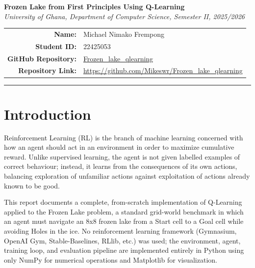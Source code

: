 \documentclass[11pt]{article}
\begin{document}
\setlength{\parskip}{5pt}
\setlength{\parindent}{0pt}

\begin{center}
{\LARGE\bfseries\color{black} Frozen Lake from First Principles Using Q-Learning}\\[6pt]
{\itshape\color{graytext} University of Ghana, Department of Computer Science, Semester II, 2025/2026}
\end{center}

\vspace{10pt}
\begin{center}
\begin{tabular}{r l}
\textbf{Name:} & Michael Nimako Frempong \\
\textbf{Student ID:} & 22425053 \\
\textbf{GitHub Repository:} & \href{https://github.com/Mikeswr/Frozen_lake_qlearning}{Frozen\_lake\_qlearning} \\
\textbf{Repository Link:} & \href{https://github.com/Mikeswr/Frozen_lake_qlearning}{https://github.com/Mikeswr/Frozen\_lake\_qlearning} \\
\end{tabular}
\end{center}

\vspace{4pt}
\noindent\textcolor{black}{\rule{\linewidth}{1pt}}
\vspace{6pt}

\section{Introduction}

Reinforcement Learning (RL) is the branch of machine learning concerned with how an agent should act in an environment in order to maximize cumulative reward. Unlike supervised learning, the agent is not given labelled examples of correct behaviour; instead, it learns from the consequences of its own actions, balancing exploration of unfamiliar actions against exploitation of actions already known to be good.

This report documents a complete, from-scratch implementation of Q-Learning applied to the Frozen Lake problem, a standard grid-world benchmark in which an agent must navigate an 8x8 frozen lake from a Start cell to a Goal cell while avoiding Holes in the ice. No reinforcement learning framework (Gymnasium, OpenAI Gym, Stable-Baselines, RLlib, etc.) was used; the environment, agent, training loop, and evaluation pipeline are implemented entirely in Python using only NumPy for numerical operations and Matplotlib for visualization.
\end{document}
